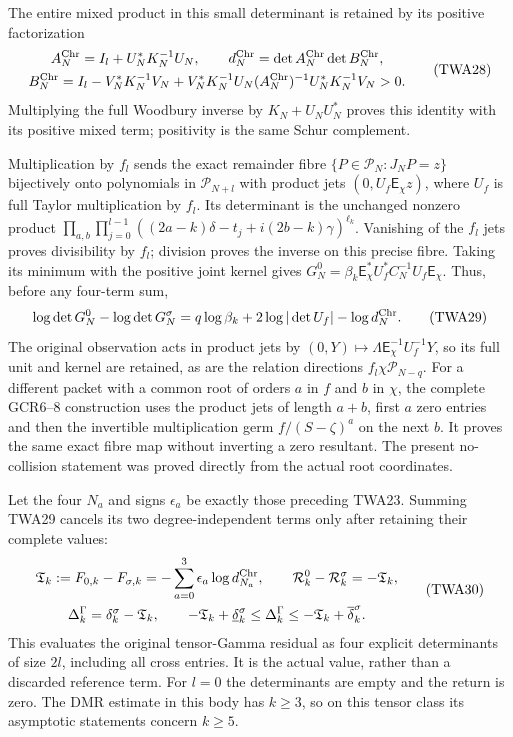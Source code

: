 The entire mixed product in this small determinant is
retained by its positive factorization
\[
\begin{gathered}
 A_N^{\rm Chr}=I_l+U_N^*K_N^{-1}U_N,\qquad
 d_N^{\rm Chr}=\det A_N^{\rm Chr}\det B_N^{\rm Chr},\\
 B_N^{\rm Chr}=I_l-V_N^*K_N^{-1}V_N
 +V_N^*K_N^{-1}U_N(A_N^{\rm Chr})^{-1}U_N^*K_N^{-1}V_N>0.
\end{gathered}\tag{TWA28}
\]
Multiplying the full Woodbury inverse by
$K_N+U_NU_N^*$ proves this identity with its positive
mixed term; positivity is the same Schur complement.

Multiplication by $f_l$ sends the exact remainder fibre
$\{P\in\mathcal P_N:J_NP=z\}$ bijectively onto polynomials
in $\mathcal P_{N+l}$ with product jets
$(0,U_f\mathsf E_\chi z)$, where $U_f$ is full Taylor
multiplication by $f_l$. Its determinant is the unchanged
nonzero product
$\prod_{a,b}\prod_{j=0}^{l-1}
((2a-k)\delta-t_j+i(2b-k)\gamma)^{\ell_k}$.
Vanishing of the $f_l$ jets proves divisibility by $f_l$;
division proves the inverse on this precise fibre.
Taking its minimum with the positive joint kernel gives
$G_N^0=\beta_k\mathsf E_\chi^*U_f^*C_N^{-1}U_f\mathsf E_\chi$.
Thus, before any four-term sum,
\[
 \log\det G_N^0-\log\det G_N^\sigma
      =q\log\beta_k+2\log|\det U_f|-\log d_N^{\rm Chr}.
 \tag{TWA29}
\]
The original observation acts in product jets by
$(0,Y)\mapsto\Lambda\mathsf E_\chi^{-1}U_f^{-1}Y$,
so its full unit and kernel are retained, as are the
relation directions $f_l\chi\mathcal P_{N-q}$.
For a different packet with a common root of orders
$a$ in $f$ and $b$ in $\chi$, the complete GCR6--8
construction uses the product jets of length $a+b$,
first $a$ zero entries and then the invertible
multiplication germ $f/(S-\zeta)^a$ on the next $b$.
It proves the same exact fibre map without inverting
a zero resultant. The present no-collision statement
was proved directly from the actual root coordinates.

Let the four $N_a$ and signs $\epsilon_a$ be exactly those
preceding TWA23. Summing TWA29 cancels its two degree-independent
terms only after retaining their complete values:
\[
\begin{gathered}
 \mathfrak T_k:=F_{0,k}-F_{\sigma,k}
       =-\sum_{a=0}^3\epsilon_a\log d_{N_a}^{\rm Chr},
 \qquad \mathcal R_k^0-\mathcal R_k^\sigma=-\mathfrak T_k,\\
 \Delta_k^\Gamma=\delta_k^\sigma-\mathfrak T_k,\qquad
 -\mathfrak T_k+\underline\delta_k^\sigma
       \leq\Delta_k^\Gamma
       \leq-\mathfrak T_k+\overline\delta_k^\sigma .
\end{gathered}\tag{TWA30}
\]
This evaluates the original tensor-Gamma residual as four
explicit determinants of size $2l$, including all cross entries.
It is the actual value, rather than a discarded reference term.
For $l=0$ the determinants are empty and the return is zero.
The DMR estimate in this body has $k\geq3$, so on this tensor
class its asymptotic statements concern $k\geq5$.

